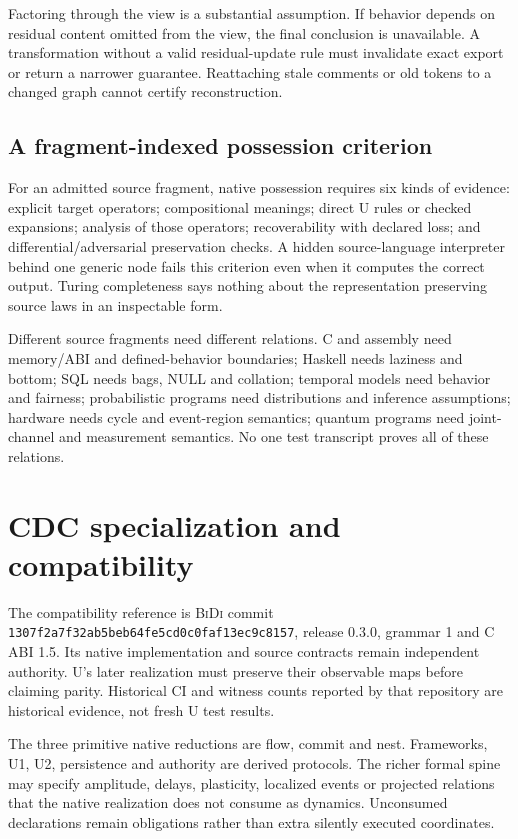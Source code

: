 \documentclass[11pt]{article}
\theoremstyle{remark}
\newcommand{\bidi}{\textsc{BiDi}}
\begin{document}
Factoring through the view is a substantial assumption. If behavior depends
on residual content omitted from the view, the final conclusion is
unavailable. A transformation without a valid residual-update rule must
invalidate exact export or return a narrower guarantee. Reattaching stale
comments or old tokens to a changed graph cannot certify reconstruction.

\subsection{A fragment-indexed possession criterion}

For an admitted source fragment, native possession requires six kinds of
evidence: explicit target operators; compositional meanings; direct U rules
or checked expansions; analysis of those operators; recoverability with
declared loss; and differential/adversarial preservation checks. A hidden
source-language interpreter behind one generic node fails this criterion
even when it computes the correct output. Turing completeness says nothing
about the representation preserving source laws in an inspectable form.

Different source fragments need different relations. C and assembly need
memory/ABI and defined-behavior boundaries; Haskell needs laziness and bottom;
SQL needs bags, NULL and collation; temporal models need behavior and fairness;
probabilistic programs need distributions and inference assumptions;
hardware needs cycle and event-region semantics; quantum programs need
joint-channel and measurement semantics. No one test transcript proves all
of these relations.

\section{CDC specialization and compatibility}
\label{sec:cdc}

The compatibility reference is \bidi{} commit
\texttt{1307f2a7f32ab5beb64fe5cd0c0faf13ec9c8157}, release 0.3.0,
grammar 1 and C ABI 1.5. Its native implementation and source contracts
remain independent authority. U's later realization must preserve their
observable maps before claiming parity. Historical CI and witness counts
reported by that repository are historical evidence, not fresh U test
results.

The three primitive native reductions are flow, commit and nest. Frameworks,
U1, U2, persistence and authority are derived protocols. The richer formal
spine may specify amplitude, delays, plasticity, localized events or projected
relations that the native realization does not consume as dynamics.
Unconsumed declarations remain obligations rather than extra silently
executed coordinates.
\end{document}
